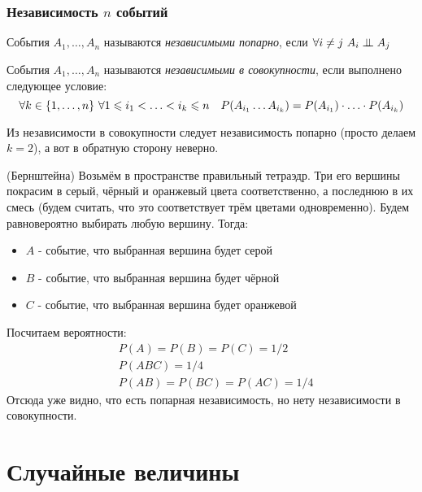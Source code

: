 \subsubsection*{Независимость $n$ событий}

\begin{definition}
	События $A_1, \ldots, A_n$ называются \textit{независимыми попарно}, если $\forall i \neq j\ A_i \perp\mkern-9.5mu\perp A_j$
\end{definition}

\begin{definition}
	События $A_1, \ldots, A_n$ называются \textit{независимыми в совокупности}, если выполнено следующее условие:
	\[
		\forall k \in \{1, \ldots, n\}\ \forall 1 \leqslant i_1 < \ldots < i_k \leqslant n \quad P(A_{i_1} \ldots A_{i_k}) = P(A_{i_1}) \cdot \ldots \cdot P(A_{i_k})
	\]
\end{definition}

\begin{note}
	Из независимости в совокупности следует независимость попарно (просто делаем $k = 2$), а вот в обратную сторону неверно.
\end{note}

\begin{example} (Бернштейна)
	Возьмём в пространстве правильный тетраэдр. Три его вершины покрасим в серый, чёрный и оранжевый цвета соответственно, а последнюю в их смесь (будем считать, что это соответствует трём цветами одновременно). Будем равновероятно выбирать любую вершину. Тогда:
	\begin{itemize}
		\item $A$ - событие, что выбранная вершина будет серой
		
		\item $B$ - событие, что выбранная вершина будет чёрной
		
		\item $C$ - событие, что выбранная вершина будет оранжевой
	\end{itemize}
	Посчитаем вероятности:
	\begin{align*}
		&{P(A) = P(B) = P(C) = 1 / 2}
		\\
		&{P(ABC) = 1 / 4}
		\\
		&{P(AB) = P(BC) = P(AC) = 1 / 4}
	\end{align*}
	Отсюда уже видно, что есть попарная независимость, но нету независимости в совокупности.
\end{example}

\section{Случайные величины}

